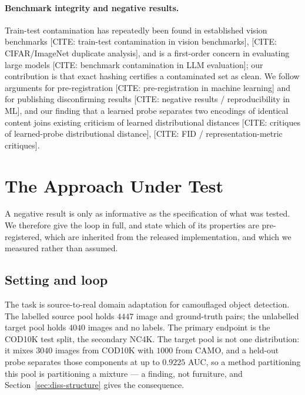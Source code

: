 \documentclass{article} %
\begin{document}
\paragraph{Benchmark integrity and negative results.} Train-test contamination has repeatedly been
found in established vision benchmarks [CITE: train-test contamination in vision benchmarks],
[CITE: CIFAR/ImageNet duplicate analysis], and is a first-order concern in evaluating large models
[CITE: benchmark contamination in LLM evaluation]; our contribution is that exact hashing certifies a
contaminated set as clean. We follow arguments for pre-registration
[CITE: pre-registration in machine learning] and for publishing disconfirming results
[CITE: negative results / reproducibility in ML], and our finding that a learned probe separates two
encodings of identical content joins existing criticism of learned distributional distances
[CITE: critiques of learned-probe distributional distance], [CITE: FID / representation-metric critiques].



\section{The Approach Under Test}
\label{sec:method}

A negative result is only as informative as the specification of what was tested. We therefore give
the loop in full, and state which of its properties are pre-registered, which are inherited from the
released implementation, and which we measured rather than assumed.

\subsection{Setting and loop}
\label{sec:method-setting}

The task is source-to-real domain adaptation for camouflaged object detection. The labelled source
pool holds $4447$ image and ground-truth pairs; the unlabelled target pool holds $4040$ images and no
labels. The primary endpoint is the COD10K test split, the secondary NC4K. The target pool is not one
distribution: it mixes $3040$ images from COD10K with $1000$ from CAMO, and a held-out probe separates
those components at up to $0.9225$ AUC, so a method partitioning this pool is partitioning a mixture
--- a finding, not furniture, and Section~\ref{sec:diss-structure} gives the consequence.
\end{document}
